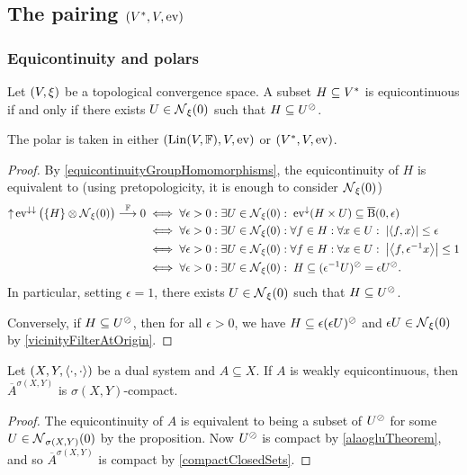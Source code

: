 \subsection{The pairing $\sSet{V^*, V, \evalMap}$}
\subsubsection{Equicontinuity and polars}
\begin{proposition} \label{equicontinuityTopologicalFunctionals}
Let $\sSet{V, \xi}$ be a topological convergence space. A subset $H\subseteq {V}^*$ is equicontinuous \textup{if and only if} there exists $U\in \operatorname{\mathcal{N}}_\xi(0)$ such that $H\subseteq U^\oslash$.
\end{proposition}
The polar is taken in either $\sSet{\Lin(V,\F), V,\evalMap}$ or
$\sSet{\dual{V}, V,\evalMap}$.
\begin{proof}
By \ref{equicontinuityGroupHomomorphisms}, the equicontinuity of $H$ is equivalent to (using pretopologicity, it is enough to consider $\operatorname{\mathcal{N}}_\xi(0)$)
\begin{align*}
\operatorname{\uparrow}\operatorname{ev}^{\downarrow\downarrow}\big(\{H\}\otimes \operatorname{\mathcal{N}}_\xi(0)\big) \overset{\mathbb{F}}{\longrightarrow} 0 &\iff \forall \epsilon >0: \exists U\in \operatorname{\mathcal{N}}_\xi(0): \; \operatorname{ev}^\downarrow(H\times U) \subseteq \operatorname{\overline{B}}(0,\epsilon) \\
&\iff \forall \epsilon >0: \exists U\in \operatorname{\mathcal{N}}_\xi(0): \forall f\in H: \forall x\in U: \; \left|\left\langle f,x \right\rangle\right|\leq \epsilon \\
&\iff \forall \epsilon >0: \exists U\in \operatorname{\mathcal{N}}_\xi(0): \forall f\in H: \forall x\in U: \; \left|\left\langle f,\epsilon^{-1}x \right\rangle\right|\leq 1 \\
&\iff \forall \epsilon >0: \exists U\in \operatorname{\mathcal{N}}_\xi(0): \;H\subseteq (\epsilon^{-1}U)^\oslash = \epsilon U^\oslash.
\end{align*}
In particular, setting $\epsilon =1$, there exists $U\in \operatorname{\mathcal{N}}_\xi(0)$ such that $H\subseteq U^\oslash$. 

Conversely, if $H\subseteq U^\oslash$, then for all $\epsilon > 0$, we have $H \subseteq \epsilon (\epsilon U)^\oslash$ and $\epsilon U\in \operatorname{\mathcal{N}}_\xi(0)$ by \ref{vicinityFilterAtOrigin}.
\end{proof}
\begin{corollary}
Let $(X,Y,\left\langle \cdot,\cdot \right\rangle)$ be a dual system and $A\subseteq X$. If $A$ is weakly equicontinuous, then $\overline{A}^{\sigma(X,Y)}$ is $\sigma(X,Y)$-compact.
\end{corollary}
\begin{proof}
The equicontinuity of $A$ is equivalent to being a subset of $U^\oslash$ for some $U\in \operatorname{\mathcal{N}}_{\sigma(X,Y)}(0)$ by the proposition. Now $U^\oslash$ is compact by \ref{alaogluTheorem}, and so $\overline{A}^{\sigma(X,Y)}$ is compact by \ref{compactClosedSets}.
\end{proof}


